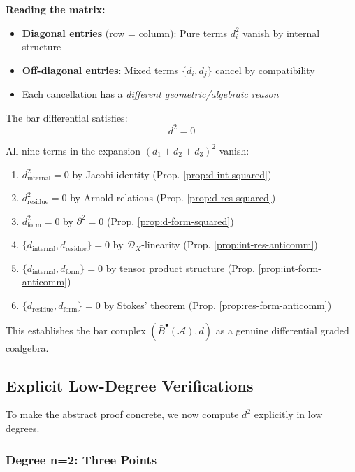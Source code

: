 \textbf{Reading the matrix:}
\begin{itemize}
\item \textbf{Diagonal entries} (row = column): Pure terms $d_i^2$ vanish by internal structure
\item \textbf{Off-diagonal entries}: Mixed terms $\{d_i, d_j\}$ cancel by compatibility
\item Each cancellation has a \emph{different geometric/algebraic reason}
\end{itemize}

\begin{theorem}\label{thm:complete-nine-terms}
The bar differential satisfies:
$$\boxed{d^2 = 0}$$

All nine terms in the expansion $(d_1 + d_2 + d_3)^2$ vanish:
\begin{enumerate}
\item $d_{\text{internal}}^2 = 0$ by Jacobi identity (Prop. \ref{prop:d-int-squared})
\item $d_{\text{residue}}^2 = 0$ by Arnold relations (Prop. \ref{prop:d-res-squared})
\item $d_{\text{form}}^2 = 0$ by $\partial^2 = 0$ (Prop. \ref{prop:d-form-squared})
\item $\{d_{\text{internal}}, d_{\text{residue}}\} = 0$ by $\mathcal{D}_X$-linearity 
(Prop. \ref{prop:int-res-anticomm})
\item $\{d_{\text{internal}}, d_{\text{form}}\} = 0$ by tensor product structure 
(Prop. \ref{prop:int-form-anticomm})
\item $\{d_{\text{residue}}, d_{\text{form}}\} = 0$ by Stokes' theorem 
(Prop. \ref{prop:res-form-anticomm})
\end{enumerate}

This establishes the bar complex $(\bar{B}^{\bullet}(\mathcal{A}), d)$ as a genuine
differential graded coalgebra.
\end{theorem}

\subsection{Explicit Low-Degree Verifications}

To make the abstract proof concrete, we now compute $d^2$ explicitly in low degrees.

\subsubsection{Degree n=2: Three Points}

